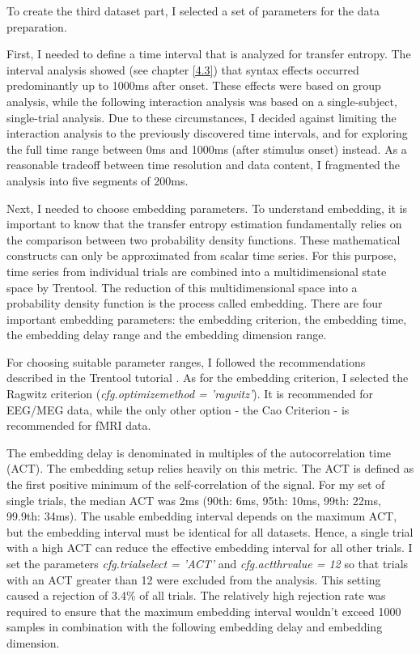 To create the third dataset part, I selected a set of parameters for the data preparation.

First, I needed to define a time interval that is analyzed for transfer entropy.
The interval analysis showed (see chapter \ref{4.3}) that syntax effects occurred predominantly up to 1000ms after onset.
These effects were based on group analysis, while the following interaction analysis was based on a single-subject, single-trial analysis.
Due to these circumstances, I decided against limiting the interaction analysis to the previously discovered time intervals, and for exploring the full time range between 0ms and 1000ms (after stimulus onset) instead.
As a reasonable tradeoff between time resolution and data content, I fragmented the analysis into five segments of 200ms.

Next, I needed to choose embedding parameters.
To understand embedding, it is important to know that the transfer entropy estimation fundamentally relies on the comparison between two probability density functions.
These mathematical constructs can only be approximated from scalar time series.
For this purpose, time series from individual trials are combined into a multidimensional state space by Trentool.
The reduction of this multidimensional space into a probability density function is the process called embedding.
There are four important embedding parameters: the embedding criterion, the embedding time, the embedding delay range and the embedding dimension range.

For choosing suitable parameter ranges, I followed the recommendations described in the Trentool tutorial \cite{3.3.TrentoolTutorial}.
As for the embedding criterion, I selected the Ragwitz criterion (\emph{cfg.optimizemethod = 'ragwitz'}).
It is recommended for EEG/MEG data, while the only other option - the Cao Criterion - is recommended for fMRI data.

The embedding delay is denominated in multiples of the autocorrelation time (ACT).
The embedding setup relies heavily on this metric.
The ACT is defined as the first positive minimum of the self-correlation of the signal.
For my set of single trials, the median ACT was 2ms (90th: 6ms, 95th: 10ms, 99th: 22ms, 99.9th: 34ms).
The usable embedding interval depends on the maximum ACT, but the embedding interval must be identical for all datasets.
Hence, a single trial with a high ACT can reduce the effective embedding interval for all other trials.
I set the parameters \emph{cfg.trialselect = 'ACT'} and \emph{cfg.actthrvalue = 12} so that trials with an ACT greater than 12 were excluded from the analysis.
This setting caused a rejection of 3.4\% of all trials.
The relatively high rejection rate was required to ensure that the maximum embedding interval wouldn't exceed 1000 samples in combination with the following embedding delay and embedding dimension.


